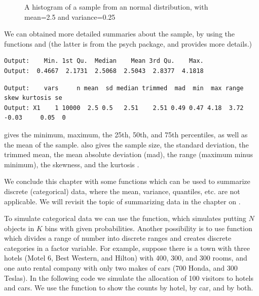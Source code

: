 \begin{knitrout}
\begin{figure}
{}

\caption[A histogram of a sample from an normal distribution, with mean=2.5 and variance=0.25]{A histogram of a sample from an normal distribution, with mean=2.5 and variance=0.25}\label{fig:intro-rnorm1}
\end{figure}

\end{knitrout}

We can obtained more detailed summaries about the sample, by using the functions  and  (the latter is from the psych package, and provides more details.)

\begin{knitrout}
\color{fgcolor}\begin{kframe}
\begin{alltt}
\hlstd{(}
\end{alltt}
\begin{verbatim}
Output:    Min. 1st Qu.  Median    Mean 3rd Qu.    Max. 
Output:  0.4667  2.1731  2.5068  2.5043  2.8377  4.1818
\end{verbatim}
\begin{alltt}
\hlopt{::}
\end{alltt}
\begin{verbatim}
Output:    vars     n mean  sd median trimmed  mad  min  max range  skew kurtosis se
Output: X1    1 10000  2.5 0.5   2.51    2.51 0.49 0.47 4.18  3.72 -0.03     0.05  0
\end{verbatim}
\end{kframe}
\end{knitrout}

  gives the minimum, maximum, the 25th, 50th, and 75th percentiles, as well as the mean of the sample.  also gives the sample size, the standard deviation, the trimmed mean, the mean absolute deviation (mad), the range (maximum minus minimum), the skewness, and the kurtosis .

We conclude this chapter with some functions which can be used to summarize discrete (categorical) data, where the mean, variance, quantiles, etc. are not applicable. We will revisit the topic of summarizing data in the chapter on .

To simulate categorical data we can use the  function, which simulates putting $N$ objects in $K$ bins with given probabilities. Another possibility is to use  function which divides a range of number into discrete ranges and creates discrete categories in a factor variable.
For example, suppose there is a town with three hotels (Motel 6, Best Western,  and Hilton) with 400, 300, and 300 rooms, and one auto rental company with only two makes of cars (700 Honda, and 300 Teslas). In the following code we simulate the allocation of 100 visitors to hotels and cars. We use the  function to show the counts by hotel, by car, and by both. 


